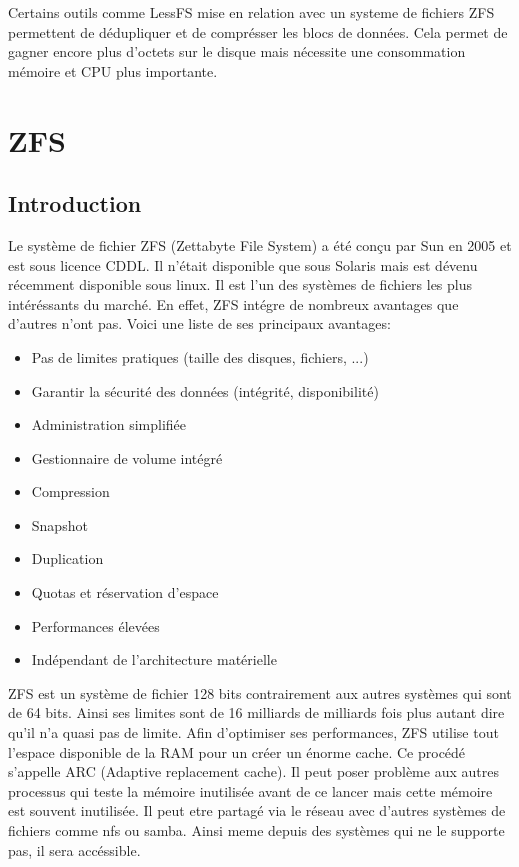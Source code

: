 \documentclass[a4paper]{report}
\begin{document}
Certains outils comme LessFS mise en relation avec un systeme de fichiers ZFS permettent de dédupliquer et de comprésser les blocs de données. Cela permet de gagner encore plus d'octets sur le disque mais nécessite une consommation mémoire et CPU plus importante.

	\chapter*{ZFS}
	\section{Introduction}
	Le système de fichier ZFS (Zettabyte File System) a été conçu par Sun en 2005 et est sous licence CDDL.  Il n'était disponible que sous Solaris mais est dévenu récemment disponible sous linux. Il est l'un des systèmes de fichiers les plus intéréssants du marché. En effet, ZFS intégre de nombreux avantages que d'autres n'ont pas. Voici une liste de ses principaux avantages: \\
	\begin{itemize}
		 \item Pas de limites pratiques (taille des disques, fichiers, ...)
		 \item Garantir la sécurité des données (intégrité, disponibilité)
		 \item Administration simplifiée
		 \item Gestionnaire de volume intégré
		 \item Compression
		 \item Snapshot
		 \item Duplication
		 \item Quotas et réservation d’espace
		 \item Performances élevées
		 \item Indépendant de l’architecture matérielle\\
	\end{itemize}
	ZFS est un système de fichier 128 bits contrairement aux autres systèmes qui sont de 64 bits. Ainsi ses limites sont de 16 milliards de milliards fois plus autant dire qu'il n'a quasi pas de limite. Afin d'optimiser ses performances, ZFS utilise tout l'espace disponible de la RAM pour un créer un énorme cache. Ce procédé s'appelle ARC (Adaptive replacement cache). Il peut poser problème aux autres processus qui teste la mémoire inutilisée avant de ce lancer mais cette mémoire est souvent inutilisée. Il peut etre partagé via le réseau avec d'autres systèmes de fichiers comme nfs ou samba. Ainsi meme depuis des systèmes qui ne le supporte pas, il sera accéssible.\\
\end{document}
